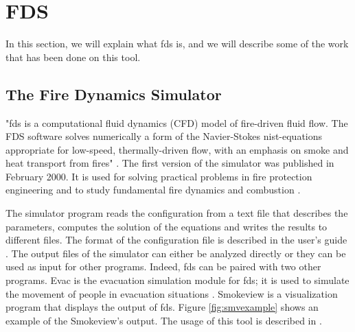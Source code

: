 
\section{FDS}
\label{sec:fds}

In this section, we will explain what \gls{fds} is, and we will describe some of
the work that has been done on this tool.

\subsection{The Fire Dynamics Simulator}
\label{sec:fdsdesc}

"\gls{fds} is a computational fluid dynamics (CFD) model of fire-driven fluid
flow. The FDS software solves numerically a form of the Navier-Stokes
nist-equations appropriate for low-speed, thermally-driven flow, with an
emphasis on smoke and heat transport from fires" \cite{fds:pres}. The first
version of the simulator was published in February 2000. It is used for solving
practical problems in fire protection engineering and to study fundamental
fire dynamics and combustion \cite{fds:tutorial}.

The simulator program reads the configuration from a text file that describes
the parameters, computes the solution of the equations and writes the results to
different files. The format of the configuration file is described in the user's
guide \cite{fdsguide}. The output files of the simulator can either be analyzed
directly or they can be used as input for other programs. Indeed, \gls{fds} can
be paired with two other programs. Evac is the evacuation simulation module for
\gls{fds}; it is used to simulate the movement of people in evacuation
situations \cite{fds:evac}. Smokeview is a visualization program that displays
the output of \gls{fds}. Figure \ref{fig:smvexample} shows an example of the
Smokeview's output. The usage of this tool is described in \cite{smvguide}.

